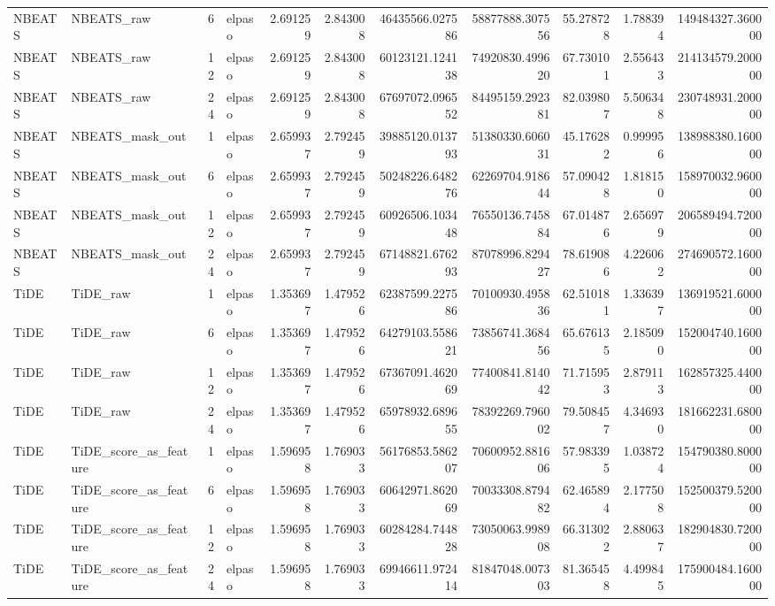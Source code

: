 \begin{longtable}{llrlrrrrrrr}
NBEATS & NBEATS\_raw & 6 & elpaso & 2.691259 & 2.843008 & 46435566.027586 & 58877888.307556 & 55.278728 & 1.788394 & 149484327.360000 \\
NBEATS & NBEATS\_raw & 12 & elpaso & 2.691259 & 2.843008 & 60123121.124138 & 74920830.499620 & 67.730101 & 2.556433 & 214134579.200000 \\
NBEATS & NBEATS\_raw & 24 & elpaso & 2.691259 & 2.843008 & 67697072.096552 & 84495159.292381 & 82.039807 & 5.506348 & 230748931.200000 \\
NBEATS & NBEATS\_mask\_out & 1 & elpaso & 2.659937 & 2.792459 & 39885120.013793 & 51380330.606031 & 45.176282 & 0.999956 & 138988380.160000 \\
NBEATS & NBEATS\_mask\_out & 6 & elpaso & 2.659937 & 2.792459 & 50248226.648276 & 62269704.918644 & 57.090428 & 1.818150 & 158970032.960000 \\
NBEATS & NBEATS\_mask\_out & 12 & elpaso & 2.659937 & 2.792459 & 60926506.103448 & 76550136.745884 & 67.014876 & 2.656979 & 206589494.720000 \\
NBEATS & NBEATS\_mask\_out & 24 & elpaso & 2.659937 & 2.792459 & 67148821.676293 & 87078996.829427 & 78.619086 & 4.226062 & 274690572.160000 \\
TiDE & TiDE\_raw & 1 & elpaso & 1.353697 & 1.479526 & 62387599.227586 & 70100930.495836 & 62.510181 & 1.336397 & 136919521.600000 \\
TiDE & TiDE\_raw & 6 & elpaso & 1.353697 & 1.479526 & 64279103.558621 & 73856741.368456 & 65.676135 & 2.185090 & 152004740.160000 \\
TiDE & TiDE\_raw & 12 & elpaso & 1.353697 & 1.479526 & 67367091.462069 & 77400841.814042 & 71.715953 & 2.879113 & 162857325.440000 \\
TiDE & TiDE\_raw & 24 & elpaso & 1.353697 & 1.479526 & 65978932.689655 & 78392269.796002 & 79.508457 & 4.346930 & 181662231.680000 \\
TiDE & TiDE\_score\_as\_feature & 1 & elpaso & 1.596958 & 1.769033 & 56176853.586207 & 70600952.881606 & 57.983395 & 1.038724 & 154790380.800000 \\
TiDE & TiDE\_score\_as\_feature & 6 & elpaso & 1.596958 & 1.769033 & 60642971.862069 & 70033308.879482 & 62.465894 & 2.177508 & 152500379.520000 \\
TiDE & TiDE\_score\_as\_feature & 12 & elpaso & 1.596958 & 1.769033 & 60284284.744828 & 73050063.998908 & 66.313022 & 2.880637 & 182904830.720000 \\
TiDE & TiDE\_score\_as\_feature & 24 & elpaso & 1.596958 & 1.769033 & 69946611.972414 & 81847048.007303 & 81.365458 & 4.499845 & 175900484.160000 \\

\end{longtable}

